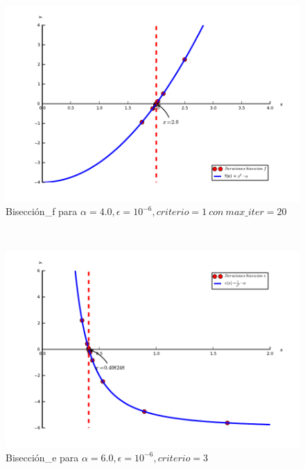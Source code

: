 
\begin{figure}[!h]
	\begin{center}
		  \includegraphics[keepaspectratio]{../Imagenes/exp1/biseccion_f.pdf}
		  \caption{Bisección\_f para $\alpha=4.0, \epsilon = 10^{-6}, criterio = 1\  con \ max\_iter=20$}
		  \label{fig:contra1}
	\end{center}
\end{figure}

~

\begin{figure}[!h]
	\begin{center}
		  \includegraphics[keepaspectratio]{../Imagenes/exp1/biseccion_e.pdf}
		  \caption{Bisección\_e para $\alpha=6.0, \epsilon = 10^{-6}, criterio = 3$}
		  \label{fig:contra1}
	\end{center}
\end{figure}

